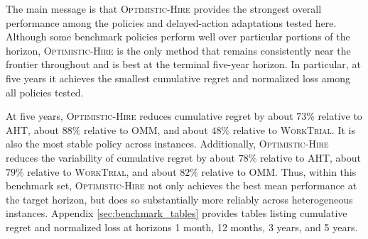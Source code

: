 \documentclass[opre,blindrev]{informs3}
\begin{document}
The main message is that \textsc{Optimistic-Hire} provides the strongest overall performance among the policies and delayed-action adaptations tested here. Although some benchmark policies perform well over particular portions of the horizon, \textsc{Optimistic-Hire} is the only method that remains consistently near the frontier throughout and is best at the terminal five-year horizon. In particular, at five years it achieves the smallest cumulative regret and normalized loss among all policies tested.


At five years, \textsc{Optimistic-Hire} reduces cumulative regret by about \(73\%\) relative to \textsc{AHT}, about \(88\%\) relative to \textsc{OMM}, and about \(48\%\) relative to \textsc{WorkTrial}. It is also the most stable policy across instances. Additionally, \textsc{Optimistic-Hire} reduces the variability of cumulative regret by about \(78\%\) relative to \textsc{AHT}, about \(79\%\) relative to \textsc{WorkTrial}, and about \(82\%\) relative to \textsc{OMM}. Thus, within this benchmark set, \textsc{Optimistic-Hire} not only achieves the best mean performance at the target horizon, but does so substantially more reliably across heterogeneous instances. Appendix \ref{sec:benchmark_tables} provides tables listing cumulative regret and normalized loss at horizons 1 month, 12 months, 3 years, and 5 years.
\end{document}
